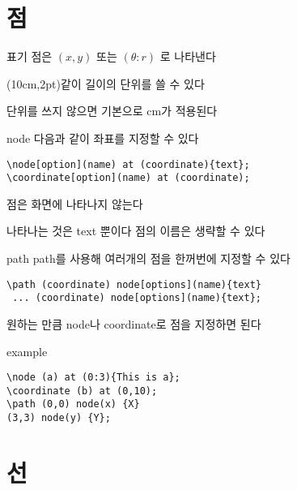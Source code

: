 \documentclass[12pt]{beamer}
\begin{document}
\section{점}

\begin{frame}{\secname}{표기}
	점은 \((x,y)\) 또는 \((\theta:r)\) 로 나타낸다
	
	\vfill
	(10cm,2pt)같이 길이의 단위를 쓸 수 있다
	
	단위를 쓰지 않으면 기본으로 cm가 적용된다
\end{frame}

\begin{frame}[fragile]{\secname}{node}
	다음과 같이 좌표를 지정할 수 있다
	\begin{lstlisting}
\node[option](name) at (coordinate){text};
\coordinate[option](name) at (coordinate);
	\end{lstlisting}
	\vfill
	점은 화면에 나타나지 않는다
	
	나타나는 것은 text 뿐이다
	\vfill
	점의 이름은 생략할 수 있다
	
\end{frame}

\begin{frame}[fragile]{\secname}{path}
	path를 사용해 여러개의 점을 한꺼번에 지정할 수 있다
	
	\begin{lstlisting}
\path (coordinate) node[options](name){text}
 ... (coordinate) node[options](name){text};
	\end{lstlisting}
	\vfill
	원하는 만큼 node나 coordinate로 점을 지정하면 된다

\end{frame}

\begin{frame}[fragile]{\secname}{example}
	\begin{lstlisting}
\node (a) at (0:3){This is a};
\coordinate (b) at (0,10);
\path (0,0) node(x) {X}
(3,3) node(y) {Y};
	\end{lstlisting}
	
\begin{center}
\end{center}

\end{frame}


\section{선}
\end{document}
